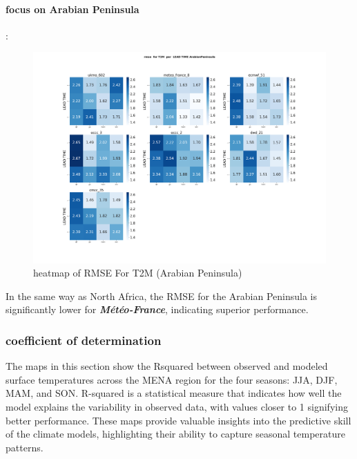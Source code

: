 \paragraph{focus on Arabian Peninsula}:

\begin{figure}[H]
\centering
\includegraphics[scale=0.3]{plots/det/rmse/rmse_T2M_ArabianPeninsula.png}
\caption{heatmap of RMSE For T2M  (Arabian Peninsula)}
\end{figure}

In the same way as North Africa, the RMSE for the Arabian Peninsula is significantly lower for \textbf{\textit{Météo-France}}, indicating superior performance.
\subsubsection{coefficient of determination}


The maps in this section show the Rsquared between observed and modeled surface temperatures across the MENA region for the four seasons: JJA, DJF, MAM, and SON. R-squared is a statistical measure that indicates how well the model explains the variability in observed data, with values closer to 1 signifying better performance. These maps provide valuable insights into the predictive skill of the climate models, highlighting their ability to capture seasonal temperature patterns.

